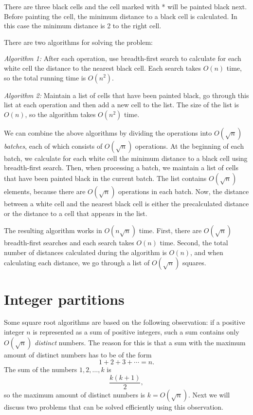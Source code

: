 \begin{center}
\end{center}

There are three black cells and the cell marked with *
will be painted black next.
Before painting the cell, the minimum distance
to a black cell is calculated.
In this case the minimum distance is 2
to the right cell.

There are two algorithms for solving the problem:

\emph{Algorithm 1:} After each operation, use breadth-first search
to calculate for each white cell the distance to the nearest black cell.
Each search takes $O(n)$ time, so the total running time is $O(n^2)$.

\emph{Algorithm 2:} Maintain a list of cells that have been
painted black, go through this list at each operation
and then add a new cell to the list.
The size of the list is $O(n)$, so the algorithm
takes $O(n^2)$ time.

We can combine the above algorithms by
dividing the operations into
$O(\sqrt n)$ \emph{batches}, each of which consists
of $O(\sqrt n)$ operations.
At the beginning of each batch,
we calculate for each white cell the minimum distance
to a black cell using breadth-first search.
Then, when processing a batch, we maintain a list of cells
that have been painted black in the current batch.
The list contains $O(\sqrt n)$ elements,
because there are $O(\sqrt n)$ operations in each batch.
Now, the distance between a white cell and the nearest black
cell is either the precalculated distance or the distance
to a cell that appears in the list.

The resulting algorithm works in
$O(n \sqrt n)$ time.
First, there are $O(\sqrt n)$ breadth-first searches
and each search takes $O(n)$ time.
Second, the total number of
distances calculated during the algorithm
is $O(n)$, and when calculating each distance,
we go through a list of $O(\sqrt n)$ squares.

\section{Integer partitions}

Some square root algorithms are based on
the following observation:
if a positive integer $n$ is represented as
a sum of positive integers,
such a sum contains only $O(\sqrt n)$ \emph{distinct} numbers.
The reason for this is that a sum with
the maximum amount of distinct numbers has to be of the form
\[1+2+3+ \cdots = n.\]
The sum of the numbers $1,2,\ldots,k$ is
\[\frac{k(k+1)}{2},\]
so the maximum amount of distinct numbers is $k = O(\sqrt n)$.
Next we will discuss two problems that can be solved
efficiently using this observation.

